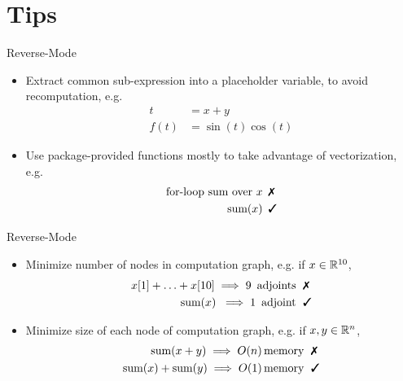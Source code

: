 \section{Tips}
\frame{\tableofcontents[currentsection]}

\begin{frame}{Reverse-Mode}
\begin{itemize}
    \item Extract common sub-expression into a placeholder variable, 
    to avoid recomputation, e.g.
    \begin{align*}
        t &= x + y \\
        f(t) &= \sin(t) \cos(t) 
    \end{align*}
    \item Use package-provided functions mostly to take advantage of vectorization, e.g.
    \begin{align*}
        \text{for-loop sum over } x \, &\text{ \xmark} \\
        \text{sum}(x) \, &\text{ \cmark} 
    \end{align*}
\end{itemize}
\end{frame}

\begin{frame}{Reverse-Mode}
\begin{itemize}
    \item Minimize number of nodes in computation graph,
    e.g. if $x \in \mathbb{R}^{10}$,
    \begin{align*}
        x[1] + \ldots + x[10] \implies 9 \, \text{ adjoints} \; &\text{ \xmark} \\
        \text{sum}(x) \; \implies 1 \, \text{ adjoint} \; &\text{ \cmark}
    \end{align*}
    \item Minimize size of each node of computation graph,
    e.g. if $x, y \in \mathbb{R}^n$,
    \begin{align*}
        \text{sum}(x+y) \implies O(n) \, \text{memory} \; &\text{ \xmark} \\
        \text{sum}(x) + \text{sum}(y) \implies O(1) \, \text{memory} \; &\text{ \cmark}
    \end{align*}
\end{itemize}
\end{frame}